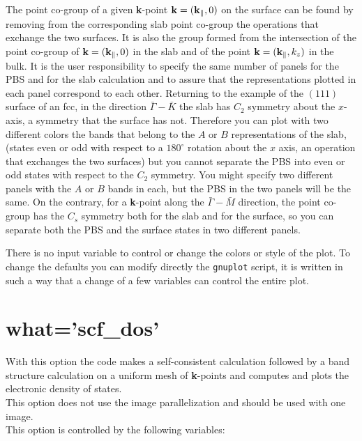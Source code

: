 \documentclass[12pt,a4paper,twoside]{report}
\begin{document}
The point co-group of a given {\bf k}-point ${\bf k}=({\bf k}_\parallel, 0)$
on the surface can be found by removing from the corresponding slab 
point co-group the
operations that exchange the two surfaces. It is also the group formed
from the intersection of the point co-group of 
${\bf k}=({\bf k}_\parallel, 0)$ in the slab and of the point 
${\bf k}=({\bf k}_\parallel, k_z)$ in the bulk.
It is the user responsibility to specify the same number of panels
for the PBS and for the slab calculation and to assure that the
representations plotted in each panel correspond to each other.
Returning to the example of the $(111)$ surface of an fcc, in the direction
$\bar \Gamma-\bar K$ the slab has $C_2$ symmetry about the $x$-axis, a symmetry
that the surface has not. Therefore you can plot with two different colors
the bands that belong to the $A$ or $B$ representations of the slab,
(states even or odd with respect to a $180^\circ$ rotation about
the $x$ axis, an operation that exchanges the two surfaces)
but you cannot separate the PBS into even or odd states with respect to 
the $C_2$ symmetry. You might specify two different panels with the
$A$ or $B$ bands in each, but the PBS in the two panels will be the same. 
On the contrary, for a {\bf k}-point along the $\bar \Gamma-\bar M$ direction, 
the point co-group has the $C_s$ symmetry both for the slab and for
the surface, so you can separate both the PBS 
and the surface states in two different panels.

There is no input variable to control or change the colors or style of the 
plot. To change the defaults you can modify directly the \texttt{gnuplot} 
script, it is written in such a way that a change of a few variables can
control the entire plot.

\newpage
{\color{coral}\section{what='scf\_dos'}}
\color{black}
With this option the code makes a self-consistent calculation followed
by a band structure calculation on a uniform mesh of {\bf k}-points and
computes and plots the electronic density of states. \\
This option does not use the image parallelization and should be used with
one image. \\
This option is controlled by the following variables:
\end{document}
